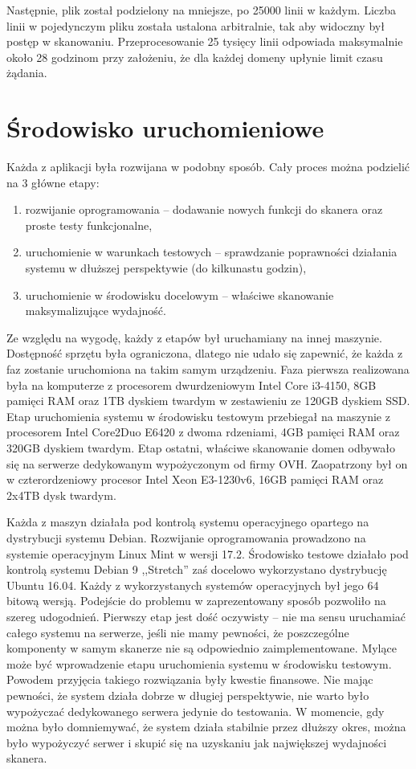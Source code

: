 Następnie, plik został podzielony na mniejsze, po 25000 linii w każdym. Liczba linii w pojedynczym pliku została ustalona arbitralnie,
tak aby widoczny był postęp w skanowaniu. Przeprocesowanie 25 tysięcy linii odpowiada maksymalnie około 28 godzinom przy założeniu,
że dla każdej domeny upłynie limit czasu żądania.

\section{Środowisko uruchomieniowe}
\noindent Każda z aplikacji była rozwijana w podobny sposób. Cały proces można podzielić na 3 główne etapy:
\begin{enumerate}
	\item rozwijanie oprogramowania -- dodawanie nowych funkcji do skanera oraz proste testy funkcjonalne,
	\item uruchomienie w warunkach testowych -- sprawdzanie poprawności działania systemu w dłuższej perspektywie (do kilkunastu godzin),
	\item uruchomienie w środowisku docelowym -- właściwe skanowanie maksymalizujące wydajność.
\end{enumerate}
Ze względu na wygodę, każdy z etapów był uruchamiany na innej maszynie. Dostępność sprzętu była ograniczona, dlatego nie udało się
zapewnić, że każda z faz zostanie uruchomiona na takim samym urządzeniu. Faza pierwsza realizowana była na komputerze z procesorem
dwurdzeniowym Intel Core i3-4150, 8GB pamięci RAM oraz 1TB dyskiem twardym w zestawieniu ze 120GB dyskiem SSD. Etap uruchomienia systemu w
środowisku testowym przebiegał na maszynie z procesorem Intel Core2Duo E6420 z dwoma rdzeniami, 4GB pamięci RAM oraz 320GB dyskiem twardym. Etap ostatni,
właściwe skanowanie domen odbywało się na serwerze dedykowanym wypożyczonym od firmy OVH. Zaopatrzony był on w czterordzeniowy
procesor Intel Xeon E3-1230v6, 16GB pamięci RAM oraz 2x4TB dysk twardym.

Każda z maszyn działała pod kontrolą systemu operacyjnego opartego na dystrybucji systemu Debian. Rozwijanie oprogramowania prowadzono
na systemie operacyjnym Linux Mint w wersji 17.2. Środowisko testowe działało pod kontrolą systemu Debian 9 ,,Stretch'' zaś docelowo
wykorzystano dystrybucję Ubuntu 16.04. Każdy z wykorzystanych systemów operacyjnych był jego 64 bitową wersją. Podejście do problemu
w zaprezentowany sposób pozwoliło na szereg udogodnień. Pierwszy etap jest dość oczywisty -- nie ma sensu uruchamiać całego systemu
na serwerze, jeśli nie mamy pewności, że poszczególne komponenty w samym skanerze nie są odpowiednio zaimplementowane. Mylące może
być wprowadzenie etapu uruchomienia systemu w środowisku testowym. Powodem przyjęcia takiego rozwiązania były kwestie finansowe.
Nie mając pewności, że system działa dobrze w długiej perspektywie, nie warto było wypożyczać dedykowanego serwera jedynie do testowania.
W momencie, gdy można było domniemywać, że system działa stabilnie przez dłuższy okres, można było wypożyczyć serwer i skupić się
na uzyskaniu jak największej wydajności skanera.

